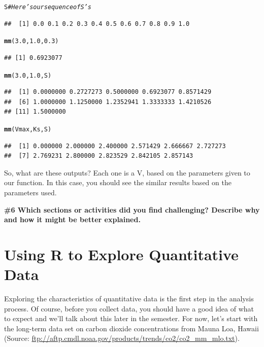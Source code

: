 \documentclass{tufte-handout}\usepackage[]{graphicx}\usepackage[]{color}
\makeatletter
\newcommand{\hlnum}[1]{\textcolor[rgb]{0.686,0.059,0.569}{#1}}%
\newcommand{\hlcom}[1]{\textcolor[rgb]{0.678,0.584,0.686}{\textit{#1}}}%
\newcommand{\hlstd}[1]{\textcolor[rgb]{0.345,0.345,0.345}{#1}}%
\newcommand{\hlkwd}[1]{\textcolor[rgb]{0.737,0.353,0.396}{\textbf{#1}}}%
\newenvironment{kframe}{%
 \def\at@end@of@kframe{}%
 \ifinner\ifhmode%
  \def\at@end@of@kframe{\end{minipage}}%
  \begin{minipage}{\columnwidth}%
 \fi\fi%
 \def\FrameCommand##1{\hskip\@totalleftmargin \hskip-\fboxsep
 \colorbox{shadecolor}{##1}\hskip-\fboxsep
     \hskip-\linewidth \hskip-\@totalleftmargin \hskip\columnwidth}%
 \MakeFramed {\advance\hsize-\width
   \@totalleftmargin\z@ \linewidth\hsize
   \@setminipage}}%
 {\par\unskip\endMakeFramed%
 \at@end@of@kframe}
\newenvironment{knitrout}{}{} %
\makeatother
\begin{document}
\begin{knitrout}
\color{fgcolor}\begin{kframe}
\begin{alltt}
\hlstd{S} \hlcom{# Here's our sequence of S's}
\end{alltt}
\begin{verbatim}
##  [1] 0.0 0.1 0.2 0.3 0.4 0.5 0.6 0.7 0.8 0.9 1.0
\end{verbatim}
\begin{alltt}
\hlkwd{mm}\hlstd{(}\hlnum{3.0}\hlstd{,} \hlnum{1.0}\hlstd{,} \hlnum{0.3}\hlstd{)}
\end{alltt}
\begin{verbatim}
## [1] 0.6923077
\end{verbatim}
\begin{alltt}
\hlkwd{mm}\hlstd{(}\hlnum{3.0}\hlstd{,} \hlnum{1.0}\hlstd{, S)}
\end{alltt}
\begin{verbatim}
##  [1] 0.0000000 0.2727273 0.5000000 0.6923077 0.8571429
##  [6] 1.0000000 1.1250000 1.2352941 1.3333333 1.4210526
## [11] 1.5000000
\end{verbatim}
\begin{alltt}
\hlkwd{mm}\hlstd{(Vmax, Ks, S)}
\end{alltt}
\begin{verbatim}
##  [1] 0.000000 2.000000 2.400000 2.571429 2.666667 2.727273
##  [7] 2.769231 2.800000 2.823529 2.842105 2.857143
\end{verbatim}
\end{kframe}
\end{knitrout}

So, what are these outputs?  Each one is a V, based on the parameters given to our function. In this case, you should see the similar results based on the parameters used. 

\bigskip
\noindent \textbf{\#6 Which sections or activities did you find challenging?  Describe why and how it might be better explained. }
 
\section{Using R to Explore Quantitative Data}

Exploring the characteristics of quantitative data is the first step in the analysis process. Of course, before you collect data, you should have a good idea of what to expect and we'll talk about this later in the semester. For now, let's start with the long-term data set on carbon dioxide concentrations from Mauna Loa, Hawaii (Source: \url{ftp://aftp.cmdl.noaa.gov/products/trends/co2/co2_mm_mlo.txt}). 
\end{document}
